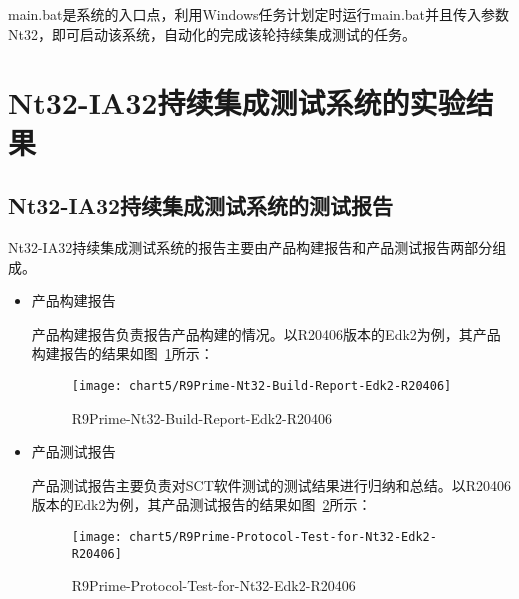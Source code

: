 		main.bat是系统的入口点，利用Windows任务计划定时运行main.bat并且传入参数Nt32，即可启动该系统，自动化的完成该轮持续集成测试的任务。	

\section{Nt32-IA32持续集成测试系统的实验结果}
	\subsection{Nt32-IA32持续集成测试系统的测试报告}
		
		Nt32-IA32持续集成测试系统的报告主要由产品构建报告和产品测试报告两部分组成。
		
		\begin{itemize}
			\item 产品构建报告
			
				产品构建报告负责报告产品构建的情况。以R20406版本的Edk2为例，其产品构建报告的结果如图~\ref{fig:R9Prime-Nt32-Build-Report-Edk2-R20406}所示：
				
				\begin{figure}[H] %
					\centering
					\texttt{[image: chart5/R9Prime-Nt32-Build-Report-Edk2-R20406]}
					\caption{R9Prime-Nt32-Build-Report-Edk2-R20406}
					\label{fig:R9Prime-Nt32-Build-Report-Edk2-R20406}
				\end{figure}
		
			\item 产品测试报告
			
				产品测试报告主要负责对SCT软件测试的测试结果进行归纳和总结。以R20406版本的Edk2为例，其产品测试报告的结果如图~\ref{fig:R9Prime-Protocol-Test-for-Nt32-Edk2-R20406}所示：
				
				\begin{figure}[H] %
					\centering
					\texttt{[image: chart5/R9Prime-Protocol-Test-for-Nt32-Edk2-R20406]}
					\caption{R9Prime-Protocol-Test-for-Nt32-Edk2-R20406}
					\label{fig:R9Prime-Protocol-Test-for-Nt32-Edk2-R20406}
				\end{figure}
				
		\end{itemize}

